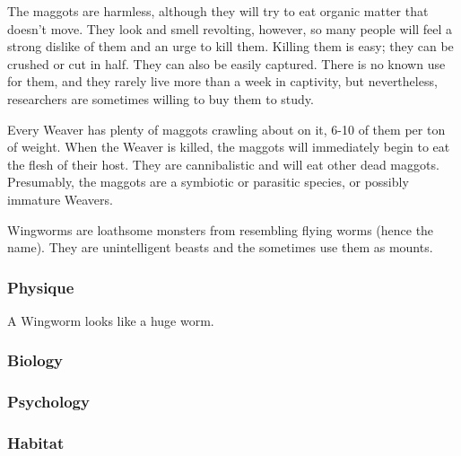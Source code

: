 The maggots are harmless, although they will try to eat organic matter that doesn't move. They look and smell revolting, however, so many people will feel a strong dislike of them and an urge to kill them. Killing them is easy; they can be crushed or cut in half. They can also be easily captured. There is no known use for them, and they rarely live more than a week in captivity, but nevertheless, researchers are sometimes willing to buy them to study. 

Every Weaver has plenty of maggots crawling about on it, 6-10 of them per ton of weight. When the Weaver is killed, the maggots will immediately begin to eat the flesh of their host. They are cannibalistic and will eat other dead maggots. Presumably, the maggots are a symbiotic or parasitic species, or possibly immature Weavers. 



Wingworms are loathsome monsters from \Erebos resembling flying worms (hence the name). They are unintelligent beasts and the \banes{} sometimes use them as mounts. 

\subsubsection{Physique}
A Wingworm looks like a huge worm. 

\subsubsection{Biology}
\subsubsection{Psychology}
\subsubsection{Habitat}





\newpage
